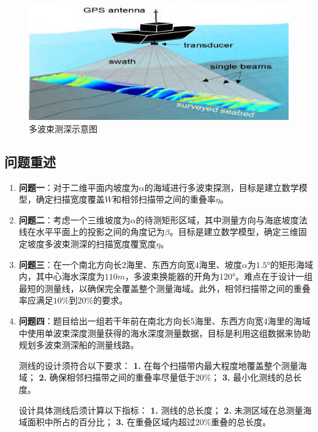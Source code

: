 \documentclass[withoutpreface,bwprint]{cumcmthesis} %
\begin{document}
    \begin{figure}[htbp]
        \centering
        \includegraphics[height=0.25\textheight]{问题背景.png}
        \caption{多波束测深示意图}
        \label{30}
    \end{figure}

    \subsection{问题重述}
    \begin{enumerate}
    \item \textbf{问题一}：对于二维平面内坡度为$\alpha$的海域进行多波束探测，目标是建立数学模型，确定扫描宽度覆盖$W$和相邻扫描带之间的重叠率$\eta$。
    \item \textbf{问题二}：考虑一个三维坡度为$\alpha$的待测矩形区域，其中测量方向与海底坡度法线在水平平面上的投影之间的角度记为$\beta$。目标是建立数学模型，确定三维固定坡度多波束测深的扫描宽度覆宽度$\eta$。
    \item \textbf{问题三}：在一个南北方向长$2$海里、东西方向宽$4$海里、坡度$\alpha$为$1.5°$的矩形海域内，其中心海水深度为$110m$，多波束换能器的开角为$120°$。难点在于设计一组最短的测量线，以确保完全覆盖整个测量海域。此外，相邻扫描带之间的重叠率应满足$10\%$到$20\%$的要求。
    \item \textbf{问题四}：题目给出一组若干年前在南北方向长5海里、东西方向宽4海里的海域中使用单波束深度测量获得的海水深度测量数据，目标是利用这组数据来协助规划多波束测深船的测量线路。
    
    测线的设计须符合以下要求：
    \textbf{1.} 在每个扫描带内最大程度地覆盖整个测量海域；
    \textbf{2.} 确保相邻扫描带之间的重叠率尽量低于20\%；
    \textbf{3.} 最小化测线的总长度。
    
    设计具体测线后须计算以下指标：
    \textbf{1.} 测线的总长度；
    \textbf{2.} 未测区域在总测量海域面积中所占的百分比；
    \textbf{3.} 在重叠区域内超过20\%重叠的总长度。
    \end{enumerate}
    
\end{document}
